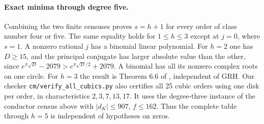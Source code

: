 \paragraph{Exact minima through degree five.}
Combining the two finite censuses proves $s=h+1$ for every order of class number four or five. The same equality holds for $1\le h\le3$ except at $j=0$, where $s=1$. A nonzero rational $j$ has a binomial linear polynomial. For $h=2$ one has $D\ge15$, and the principal conjugate has larger absolute value than the other, since $e^{\pi\sqrt D}-2079>e^{\pi\sqrt D/2}+2079$. A binomial has all its nonzero complex roots on one circle. For $h=3$ the result is Theorem 6.6 of \cite{riffaut}, independent of GRH. Our checker \texttt{cm/verify\_all\_cubics.py} also certifies all 25 cubic orders using one disk per order, in characteristics $2,3,7,13,17$. It uses the degree-three instance of the conductor census above with $|d_K|\le907$, $f\le162$. Thus the complete table through $h=5$ is independent of hypotheses on zeros.
